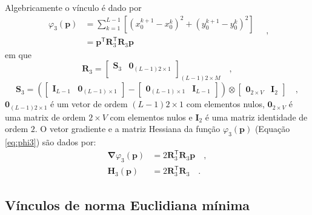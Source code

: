 Algebricamente o vínculo é dado por
\begin{equation}\label{eq:phi3}
\begin{split}
\varphi_{3}(\mathbf{p}) &= \sum\limits^{L-1}_{k=1}\left[\left(x_{0}^{k+1} - x_{0}^{k}\right)^2 + \left(y_{0}^{k+1} - y_{0}^{k}\right)^2 \right] \\
&= \mathbf{p}^{\mathsf{T}} \mathbf{R}^{\mathsf{T}}_{3}\mathbf{R}_{3}\mathbf{p}
\end{split} \quad ,
\end{equation}
em que 
\begin{equation}
\mathbf{R}_{3} = 
\begin{bmatrix}
\mathbf{S}_{3} & \mathbf{0}_{(L-1)2 \times 1} \\
\end{bmatrix}_{(L-1)2 \times M} \quad ,
\label{eq:R3-matrix}
\end{equation}
\begin{equation}
\mathbf{S}_{3} =
\left( 
\begin{bmatrix} \mathbf{I}_{L-1} & \mathbf{0}_{(L-1) \times 1} \end{bmatrix} -
\begin{bmatrix} \mathbf{0}_{(L-1) \times 1} & \mathbf{I}_{L-1} \end{bmatrix} 
\right) \otimes 
\begin{bmatrix} \mathbf{0}_{2 \times V} & \mathbf{I}_{2} \end{bmatrix} \quad ,
\label{eq:S3-matrix}
\end{equation}
$\mathbf{0}_{(L-1)2 \times 1}$ é um vetor de ordem $(L-1)2 \times 1$ com elementos nulos,
$\mathbf{0}_{2 \times V}$ é uma matrix de ordem $2 \times V$ com elementos nulos e 
$\mathbf{I}_{2}$ é uma matriz identidade de ordem $2$. O vetor gradiente e a matriz Hessiana da função $\varphi_{3}(\mathbf{p})$ (Equação \ref{eq:phi3}) são dados por:
\begin{equation}\label{eq:phi3_gh}
\begin{split}
\boldsymbol{\nabla}\varphi_{3}(\mathbf{p}) &= 2\mathbf{R}^\mathsf{T}_{3}\mathbf{R}_{3}\mathbf{p} \quad ,\\
\mathbf{H}_{3}(\mathbf{p}) &= 2\mathbf{R}^\mathsf{T}_{3}\mathbf{R}_{3} \quad .
\end{split}
\end{equation}

\subsection{Vínculos de norma Euclidiana mínima}

